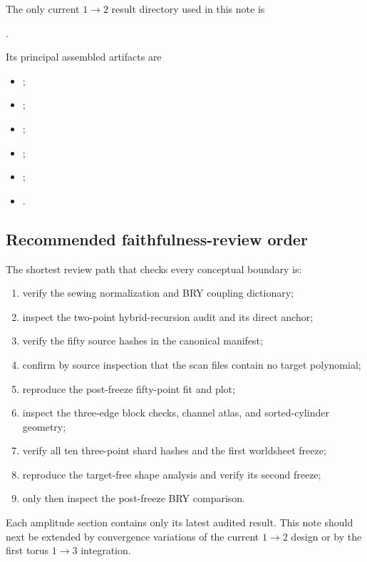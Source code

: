 \documentclass[11pt]{article}
\begin{document}
The only current $1\to2$ result directory used in this note is
\begin{center}
\small
{}.
\end{center}
Its principal assembled artifacts are
\begin{itemize}
  \item {};
  \item {};
  \item {};
  \item {};
  \item {};
  \item {}.
\end{itemize}

\subsection{Recommended faithfulness-review order}

The shortest review path that checks every conceptual boundary is:
\begin{enumerate}
  \item verify the sewing normalization and BRY coupling dictionary;
  \item inspect the two-point hybrid-recursion audit and its direct anchor;
  \item verify the fifty source hashes in the canonical manifest;
  \item confirm by source inspection that the scan files contain no target
  polynomial;
  \item reproduce the post-freeze fifty-point fit and plot;
  \item inspect the three-edge block checks, channel atlas, and sorted-cylinder
  geometry;
  \item verify all ten three-point shard hashes and the first worldsheet freeze;
  \item reproduce the target-free shape analysis and verify its second freeze;
  \item only then inspect the post-freeze BRY comparison.
\end{enumerate}

Each amplitude section contains only its latest audited result.  This note
should next be extended by convergence variations of the current $1\to2$
design or by the first torus $1\to3$ integration.
\end{document}
